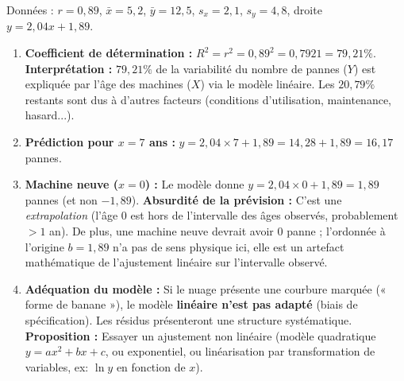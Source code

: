 \documentclass[11pt]{article}
\begin{document}
\begin{corrige}
Données : $r=0,89$, $\bar{x}=5,2$, $\bar{y}=12,5$, $s_x=2,1$, $s_y=4,8$, droite $y = 2,04x + 1,89$.

\begin{enumerate}
\item \textbf{Coefficient de détermination :} $R^2 = r^2 = 0,89^2 = 0,7921 = 79,21\%$.
\textbf{Interprétation :} $79,21\%$ de la variabilité du nombre de pannes ($Y$) est expliquée par l'âge des machines ($X$) via le modèle linéaire. Les $20,79\%$ restants sont dus à d'autres facteurs (conditions d'utilisation, maintenance, hasard...).

\item \textbf{Prédiction pour $x=7$ ans :} $y = 2,04 \times 7 + 1,89 = 14,28 + 1,89 = 16,17$ pannes.

\item \textbf{Machine neuve ($x=0$) :} Le modèle donne $y = 2,04 \times 0 + 1,89 = 1,89$ pannes (et non $-1,89$).
\textbf{Absurdité de la prévision :} C'est une \emph{extrapolation} (l'âge 0 est hors de l'intervalle des âges observés, probablement $>1$ an). De plus, une machine neuve devrait avoir 0 panne ; l'ordonnée à l'origine $b=1,89$ n'a pas de sens physique ici, elle est un artefact mathématique de l'ajustement linéaire sur l'intervalle observé.

\item \textbf{Adéquation du modèle :} Si le nuage présente une courbure marquée (« forme de banane »), le modèle \textbf{linéaire n'est pas adapté} (biais de spécification). Les résidus présenteront une structure systématique.
\textbf{Proposition :} Essayer un ajustement non linéaire (modèle quadratique $y = ax^2+bx+c$, ou exponentiel, ou linéarisation par transformation de variables, ex: $\ln y$ en fonction de $x$).
\end{enumerate}
\end{corrige}
\end{document}
